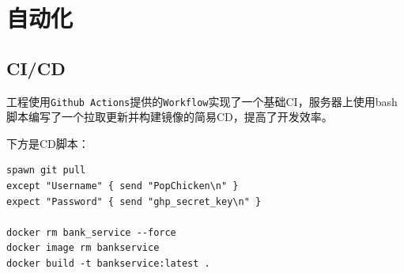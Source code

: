 \documentclass[hyperref]{ctexart}
\begin{document}
\section{自动化}
\subsection{CI/CD}
工程使用\texttt{Github Actions}提供的\texttt{Workflow}实现了一个基础CI，服务器上使用bash脚本编写了一个拉取更新并构建镜像的简易CD，提高了开发效率。
\par 下方是CD脚本：
\lstset{
    language=sh
}
\begin{lstlisting}
spawn git pull
except "Username" { send "PopChicken\n" }
expect "Password" { send "ghp_secret_key\n" }

docker rm bank_service --force
docker image rm bankservice
docker build -t bankservice:latest .
\end{lstlisting}
\end{document}
